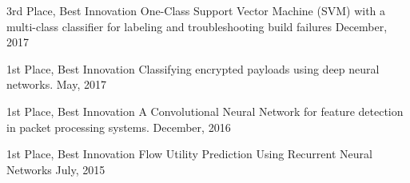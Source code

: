 



\begin{cvhonors}

  \cvhonor
    {3rd Place, Best Innovation} %
    {One-Class Support Vector Machine (SVM) with a multi-class classifier
for labeling and troubleshooting build failures} %
    {} %
    {December, 2017} %

  \cvhonor
    {1st Place, Best Innovation} %
    {Classifying encrypted payloads using deep neural networks.} %
    {} %
    {May, 2017} %

  \cvhonor
    {1st Place, Best Innovation} %
    {A Convolutional Neural Network for feature detection in packet processing systems.} %
    {} %
    {December, 2016} %

  \cvhonor
    {1st Place, Best Innovation} %
    {Flow Utility Prediction Using Recurrent Neural Networks} %
    {} %
    {July, 2015} %

\end{cvhonors}
